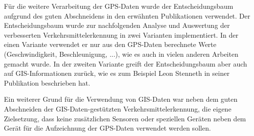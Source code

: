 Für die weitere Verarbeitung der GPS-Daten wurde der Entscheidungsbaum aufgrund des guten Abschneidens in den erwähnten Publikationen verwendet. Der Entscheidungsbaum wurde zur nachfolgenden Analyse und Auswertung der verbesserten Verkehrsmittelerkennung in zwei Varianten implementiert. In der einen Variante verwendet er nur aus den GPS-Daten berechnete Werte (Geschwindigkeit, Beschleunigung, ...), wie es auch in vielen anderen Arbeiten gemacht wurde. In der zweiten Variante greift der Entscheidungsbaum aber auch auf GIS-Informationen zurück, wie es zum Beispiel Leon Stenneth in seiner Publikation  \cite{stenneth_transportation_2011} beschrieben hat.

Ein weiterer Grund für die Verwendung von GIS-Daten war neben dem guten Abschneiden der GIS-Daten-gestützten Verkehrsmittelerkennung, die eigene Zielsetzung, dass keine zusätzlichen Sensoren oder speziellen Geräten neben dem Gerät für die Aufzeichnung der GPS-Daten verwendet werden sollen.
